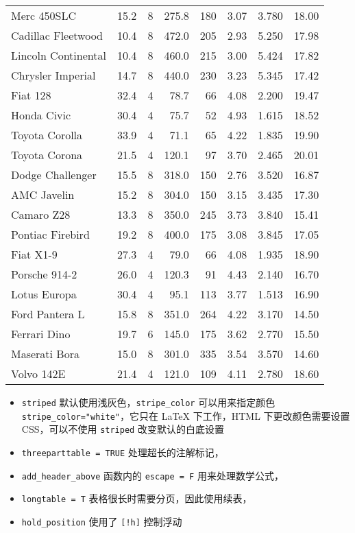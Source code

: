 \documentclass[]{book}
\begin{document}
\begin{ThreePartTable}
\begin{longtable}[t]{lrrrrrrr}
Merc 450SLC & 15.2 & 8 & 275.8 & 180 & 3.07 & 3.780 & 18.00\\
Cadillac Fleetwood & 10.4 & 8 & 472.0 & 205 & 2.93 & 5.250 & 17.98\\
Lincoln Continental & 10.4 & 8 & 460.0 & 215 & 3.00 & 5.424 & 17.82\\
Chrysler Imperial & 14.7 & 8 & 440.0 & 230 & 3.23 & 5.345 & 17.42\\
Fiat 128 & 32.4 & 4 & 78.7 & 66 & 4.08 & 2.200 & 19.47\\
\midrule
Honda Civic & 30.4 & 4 & 75.7 & 52 & 4.93 & 1.615 & 18.52\\
Toyota Corolla & 33.9 & 4 & 71.1 & 65 & 4.22 & 1.835 & 19.90\\
Toyota Corona & 21.5 & 4 & 120.1 & 97 & 3.70 & 2.465 & 20.01\\
Dodge Challenger & 15.5 & 8 & 318.0 & 150 & 2.76 & 3.520 & 16.87\\
AMC Javelin & 15.2 & 8 & 304.0 & 150 & 3.15 & 3.435 & 17.30\\
Camaro Z28 & 13.3 & 8 & 350.0 & 245 & 3.73 & 3.840 & 15.41\\
\midrule
Pontiac Firebird & 19.2 & 8 & 400.0 & 175 & 3.08 & 3.845 & 17.05\\
Fiat X1-9 & 27.3 & 4 & 79.0 & 66 & 4.08 & 1.935 & 18.90\\
Porsche 914-2 & 26.0 & 4 & 120.3 & 91 & 4.43 & 2.140 & 16.70\\
Lotus Europa & 30.4 & 4 & 95.1 & 113 & 3.77 & 1.513 & 16.90\\
Ford Pantera L & 15.8 & 8 & 351.0 & 264 & 4.22 & 3.170 & 14.50\\
Ferrari Dino & 19.7 & 6 & 145.0 & 175 & 3.62 & 2.770 & 15.50\\
\midrule
Maserati Bora & 15.0 & 8 & 301.0 & 335 & 3.54 & 3.570 & 14.60\\
Volvo 142E & 21.4 & 4 & 121.0 & 109 & 4.11 & 2.780 & 18.60\\*
\end{longtable}
\end{ThreePartTable}

\begin{itemize}
\item
  \texttt{striped} 默认使用浅灰色，\texttt{stripe\_color}
  可以用来指定颜色 \texttt{stripe\_color="white"}，它只在 LaTeX
  下工作，HTML 下更改颜色需要设置 CSS，可以不使用 \texttt{striped}
  改变默认的白底设置
\item
  \texttt{threeparttable\ =\ TRUE} 处理超长的注解标记，
\item
  \texttt{add\_header\_above} 函数内的 \texttt{escape\ =\ F}
  用来处理数学公式，
\item
  \texttt{longtable\ =\ T} 表格很长时需要分页，因此使用续表，
\item
  \texttt{hold\_position} 使用了 \texttt{{[}!h{]}} 控制浮动
\end{itemize}
\end{document}
